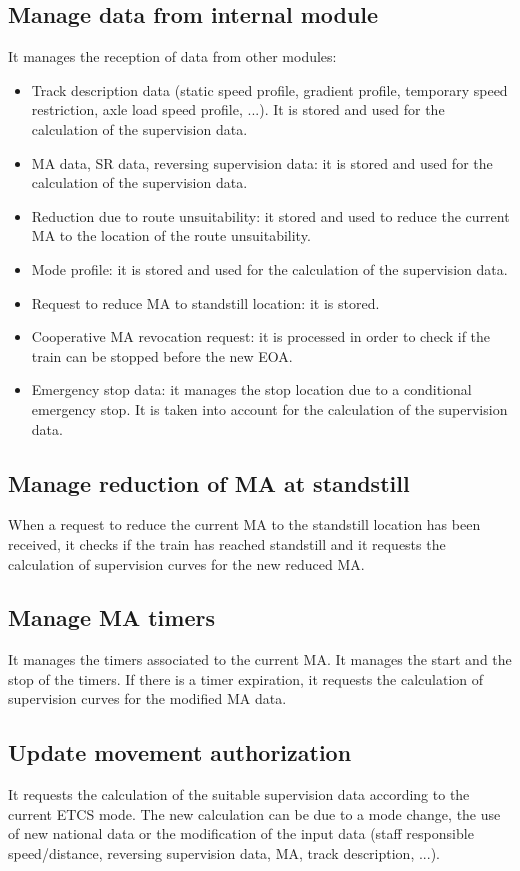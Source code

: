 \documentclass[nocc]{template/openetcs_report}
\begin{document}
\subsection{Manage data from internal module}
It manages the reception of data from other modules:
\begin{itemize}
\item Track description data (static speed profile, gradient profile, temporary speed restriction, axle load speed profile, ...). It is stored and used for the calculation of the supervision data.
\item MA data, SR data, reversing supervision data: it is stored and used for the calculation of the supervision data.
\item Reduction due to route unsuitability: it stored and used to reduce the current MA to the location of the route unsuitability.
\item Mode profile: it is stored and used for the calculation of the supervision data.
\item Request to reduce MA to standstill location: it is stored.
\item Cooperative MA revocation request: it is processed in order to check if the train can be stopped before the new EOA.
\item Emergency stop data: it manages the stop location due to a conditional emergency stop. It is taken into account for the calculation of the supervision data.
\end{itemize}

\subsection{Manage reduction of MA at standstill}
When a request to reduce the current MA to the standstill location has been received, it checks if the train has reached standstill and it requests the calculation of supervision curves for the new reduced MA.

\subsection{Manage MA timers}
It manages the timers associated to the current MA. 
It manages the start and the stop of the timers. If there is a timer expiration, it requests the calculation of supervision curves for the modified MA data.

\subsection{Update movement authorization}
It requests the calculation of the suitable supervision data according to the current ETCS mode. The new calculation can be due to a mode change, the use of new national data or the modification of the input data (staff responsible speed/distance, reversing supervision data, MA, track description, ...).
\end{document}
